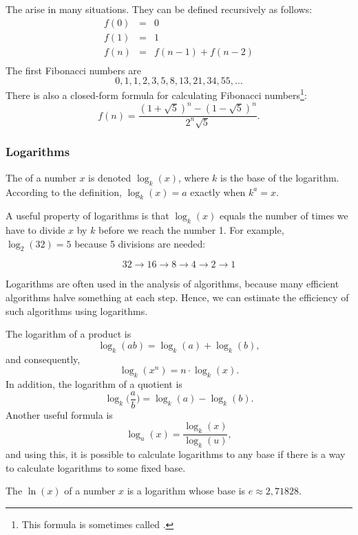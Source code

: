 
The 
arise in many situations.
They can be defined recursively as follows:
\[
\begin{array}{lcl}
f(0) & = & 0 \\
f(1) & = & 1 \\
f(n) & = & f(n-1)+f(n-2) \\
\end{array}
\]
The first Fibonacci numbers are
\[0, 1, 1, 2, 3, 5, 8, 13, 21, 34, 55, \ldots\]
There is also a closed-form formula
for calculating Fibonacci numbers\footnote{This formula is sometimes called
 .}:
\[f(n)=\frac{(1 + \sqrt{5})^n - (1-\sqrt{5})^n}{2^n \sqrt{5}}.\]

\subsubsection{Logarithms}


The  of a number $x$
is denoted $\log_k(x)$, where $k$ is the base
of the logarithm.
According to the definition,
$\log_k(x)=a$ exactly when $k^a=x$.

A useful property of logarithms is
that $\log_k(x)$ equals the number of times
we have to divide $x$ by $k$ before we reach 
the number 1.
For example, $\log_2(32)=5$
because 5 divisions are needed:

\[32 \rightarrow 16 \rightarrow 8 \rightarrow 4 \rightarrow 2 \rightarrow 1 \]

Logarithms are often used in the analysis of
algorithms, because many efficient algorithms
halve something at each step.
Hence, we can estimate the efficiency of such algorithms
using logarithms.

The logarithm of a product is
\[\log_k(ab) = \log_k(a)+\log_k(b),\]
and consequently,
\[\log_k(x^n) = n \cdot \log_k(x).\]
In addition, the logarithm of a quotient is
\[\log_k\Big(\frac{a}{b}\Big) = \log_k(a)-\log_k(b).\]
Another useful formula is
\[\log_u(x) = \frac{\log_k(x)}{\log_k(u)},\]
and using this, it is possible to calculate
logarithms to any base if there is a way to
calculate logarithms to some fixed base.


The  $\ln(x)$ of a number $x$
is a logarithm whose base is $e \approx 2{,}71828$.

